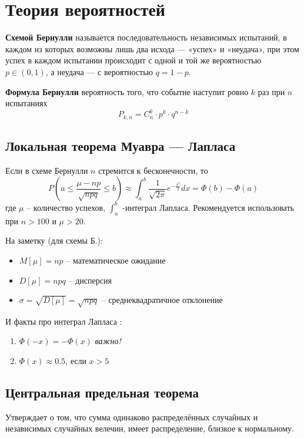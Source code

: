 



\section{Теория вероятностей}

\textbf{Схемой Бернулли}  называется последовательность независимых испытаний, в каждом из которых возможны лишь два исхода — «успех» и «неудача», при этом успех в каждом испытании происходит с одной и той же вероятностью  $p \in (0, 1)$, а неудача — с вероятностью $q = 1 - p$.

\textbf{Формула Бернулли} вероятность того, что событие наступит ровно $k$ раз при $n$ испытаниях
\begin{equation}
	P_{k,n}=C_n^k\cdot p^k \cdot q^{n-k}
\end{equation}

\subsection{Локальная теорема Муавра — Лапласа}

Если в схеме Бернулли $n$ стремится к бесконечности, то  
\begin{equation}
	P(a \leq\frac{\mu - np}{\sqrt{npq}} \leq b) 	\approx \int_{a}^{b} \frac{1}{\sqrt{2\pi}} e^{-\frac{x^2}{2}} dx = \Phi(b) - \Phi(a)
\end{equation}
где $\mu$ -- количество успехов, $\int_a^b$ -интеграл Лапласа. Рекомендуется использовать при $n > 100$ и $\mu > 20$. 

На заметку (для схемы Б.):
\begin{itemize}
	\item $M[\mu] = np$ -- математическое ожидание
	\item $D[\mu] = npq$ -- дисперсия
	\item $ \sigma = \sqrt{D[\mu]} = \sqrt{npq}$ -- среднеквадратичное отклонение
\end{itemize}
\vspace{1em}
И факты про интеграл Лапласа :
\begin{enumerate}
	\item $\Phi(-x) = - \Phi(x)$ \textit{важно!}
	\item $\Phi(x)\approx  0.5$, если $x > 5$
\end{enumerate}

\subsection{Центральная предельная теорема}
Утверждает о том, что сумма одинаково распределённых случайных и независимых случайных велечин, имеет распределение, близкое к нормальному.

